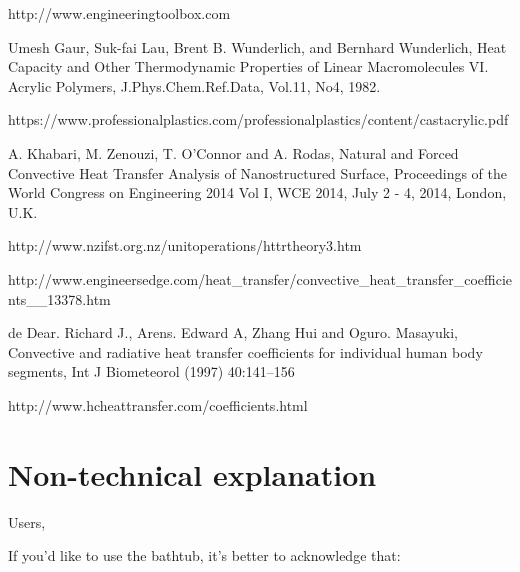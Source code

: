 \documentclass[12pt,a4paper,titlepage]{article}
\begin{document}
\begin{thebibliography}{99}


 http://www.engineeringtoolbox.com

 Umesh Gaur, Suk-fai Lau, Brent B. Wunderlich, and Bernhard Wunderlich, Heat Capacity and Other Thermodynamic Properties of Linear Macromolecules VI. Acrylic Polymers, J.Phys.Chem.Ref.Data, Vol.11, No4, 1982.

 https://www.professionalplastics.com/professionalplastics/content/castacrylic.pdf

 A. Khabari, M. Zenouzi, T. O’Connor and A. Rodas, Natural and Forced Convective Heat Transfer Analysis of Nanostructured Surface, Proceedings of the World Congress on Engineering 2014 Vol I, WCE 2014, July 2 - 4, 2014, London, U.K.

 http://www.nzifst.org.nz/unitoperations/httrtheory3.htm

 http://www.engineersedge.com/heat\_transfer/convective\_heat\_transfer\_coefficients\_\_13378.htm

 de Dear. Richard J., Arens. Edward A, Zhang Hui and Oguro. Masayuki, Convective and radiative heat transfer coefficients for individual human body segments, Int J Biometeorol (1997) 40:141–156

 http://www.hcheattransfer.com/coefficients.html

\end{thebibliography}

\label{LastPage}

\section{Non-technical explanation}

Users,

If you'd like to use the bathtub, it's better to acknowledge that:
\end{document}
